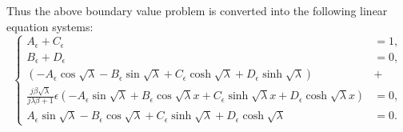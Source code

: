 \documentclass{article}
\begin{document}
Thus the above boundary value problem is converted into the following linear equation systems:
\begin{equation}
    \left\{\begin{aligned}
        A_\epsilon + C_\epsilon &= 1, \\
        B_\epsilon + D_\epsilon &= 0, \\
        \left( - A_\epsilon \cos{\sqrt{\lambda}} - B_\epsilon \sin{\sqrt{\lambda}} + C_\epsilon \cosh{\sqrt{\lambda}} + D_\epsilon \sinh{\sqrt{\lambda}} \right) &+ \\
        \frac{j \beta \sqrt{\lambda}}{ j\lambda \beta + 1 } \epsilon \left( - A_\epsilon \sin{\sqrt{\lambda}} + B_\epsilon \cos{\sqrt{\lambda}x} + C_\epsilon \sinh{\sqrt{\lambda}x} + D_\epsilon \cosh{\sqrt{\lambda}x} \right) &= 0, \\
        A_\epsilon \sin{\sqrt{\lambda}} - B_\epsilon \cos{\sqrt{\lambda}} + C_\epsilon \sinh{\sqrt{\lambda}} + D_\epsilon \cosh{\sqrt{\lambda}} &= 0.
    \end{aligned}\right.
\end{equation}
\end{document}
